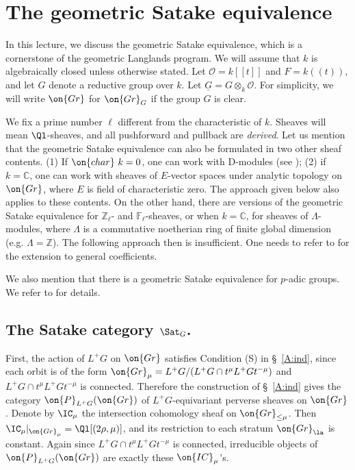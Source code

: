 \documentclass[]{pcmi}
\theoremstyle{plain}
\theoremstyle{remark}
\theoremstyle{definition}
\newcommand{\bC}{{\mathbb C}}
\newcommand{\bF}{{\mathbb F}}
\newcommand{\bZ}{{\mathbb Z}}
\newcommand{\mO}{{\mathcal O}}
\newcommand{\cha}{{\on{char}}}
\newcommand{\Gr}{{\on{Gr}}}
\begin{document}
\section{The geometric Satake equivalence}\label{Lecture V}
In this lecture, we discuss the geometric Satake equivalence, which is a cornerstone of the geometric Langlands program. 
We will assume that $k$ is algebraically closed unless otherwise stated. Let $\mO=k[[t]]$ and $F=k((t))$, and let $G$ denote a reductive group over $k$. Let $\underline G= G\otimes_k\mO$. For simplicity, we will write $\Gr$ for $\Gr_G$ if the group $G$ is clear.

We fix a prime number $\ell$ different from the characteristic of $k$.
Sheaves will mean $\Ql$-sheaves, and all pushforward and pullback are \emph{derived}.
Let us mention that the geometric Satake equivalence can also be formulated
in two other sheaf contents. (1) If $\cha\ k=0$, one can work with D-modules (see \cite[\S\ 5.3]{BD}); (2) if $k=\bC$, one can work with sheaves of $E$-vector spaces under analytic topology on $\Gr$, where $E$ is field of characteristic zero. The approach given below also applies to these contents.
On the other hand, there are versions of the geometric Satake equivalence for $\bZ_\ell$- and $\bF_\ell$-sheaves, or when $k=\bC$, for sheaves of $\Lambda$-modules, where $\Lambda$ is a commutative noetherian ring of finite global dimension (e.g. $\Lambda=\bZ$). The following approach then is insufficient. One needs to refer to \cite{MV} for the extension to general coefficients.
 
We also mention that there is a geometric Satake equivalence for $p$-adic groups. We refer to \cite{Z14} for details.

\subsection{The Satake category $\Sat_G$.}

First, the action of $L^+G$ on $\Gr$ satisfies Condition (S) in \S~\ref{A:ind}, since each orbit is of the form $\Gr_\mu=L^+G/(L^+G\cap t^{\mu} L^+G t^{-\mu})$ and  $L^+G\cap t^{\mu} L^+G t^{-\mu}$ is connected.
Therefore the construction of \S~\ref{A:ind} gives the category $\on{P}_{L^+G}(\Gr)$ of $L^+G$-equivariant perverse sheaves on $\Gr$. Denote by $\IC_\mu$ the intersection cohomology sheaf on $\Gr_{\leq \mu}$. Then
$\IC_\mu|_{\Gr_\mu}=\Ql[(2\rho,\mu)]$, and its restriction to each stratum $\Gr_\la$ is constant. Again since  $L^+G\cap t^{\mu} L^+G t^{-\mu}$ is connected, irreducible objects of $\on{P}_{L^+G}(\Gr)$ are exactly these $\on{IC}_\mu$'s. 
\end{document}
